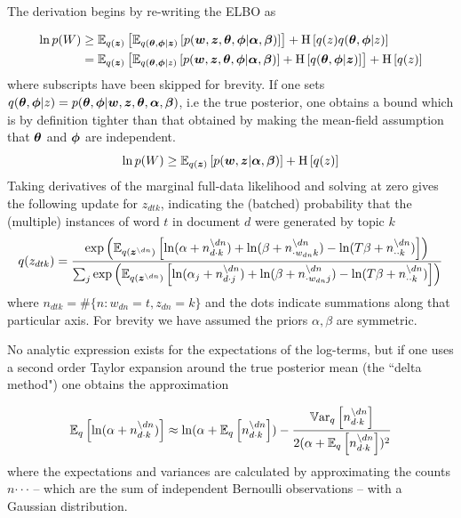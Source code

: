 The derivation begins by re-writing the ELBO as

\begin{align}
\ln p(W) & \geq \ex{\ex{p(\vv{w},\vv{z},\vv{\theta},\vv{\phi}|\vv{\alpha},\vv{\beta})}{q(\vv{\theta},\vv{\phi}|\vv{z})}}{q(\vv{z})}
+\ent{q(z)q(\vv{\theta},\vv{\phi}|z)}\\
& = \ex{\ex{p(\vv{w},\vv{z},\vv{\theta},\vv{\phi}|\vv{\alpha},\vv{\beta})}{q(\vv{\theta},\vv{\phi}|z)} + \ent{q(\vv{\theta},\vv{\phi}|\vv{z})}}{q(\vv{z})}
+\ent{q(z)} 
\end{align}
where subscripts have been skipped for brevity. If one sets $q(\vv{\theta},\vv{\phi}|z) = p(\vv{\theta},\vv{\phi}|\vv{w},\vv{z},\vv{\theta},\vv{\alpha},\vv{\beta})$, i.e the true posterior, one obtains a bound which is by definition tighter than that obtained by making the mean-field assumption that $\vv{\theta}$ and $\vv{\phi}$ are independent. 
\begin{equation}
\ln p(W) \geq \ex{p(\vv{w},\vv{z}|\vv{\alpha},\vv{\beta})}{q(\vv{z})} + \ent{q(z)}
\end{equation}
Taking derivatives of the marginal full-data likelihood and solving at zero gives the following update for $z_{dtk}$, indicating the (batched) probability that the (multiple) instances of word $t$ in document $d$ were generated by topic $k$
{\small
\begin{align}
q(z_{dtk}) =
\frac{
    \exp\left(
        \ex{
            \ln(\alpha + n_{d\cdot k}^{\setminus dn})
            +\ln(\beta + n_{\cdot w_{dn} k}^{\setminus dn})
            -\ln(T \beta + n_{\cdot \cdot k}^{\setminus dn})
        }{q(\vv{z}^{\setminus dn})}
    \right)
} {
    \sum_j \exp \left(
        \ex{
            \ln(\alpha_j + n_{d\cdot j}^{\setminus dn})
            +\ln(\beta + n_{\cdot w_{dn} j}^{\setminus dn})
            -\ln(T \beta + n_{\cdot \cdot k}^{\setminus dn})
        }{q(\vv{z}^{\setminus dn})}
    \right)
}
\end{align}
}
where $n_{dtk} = \#\{n : w_{dn} = t, z_{dn} = k\}$ and the dots indicate summations along that particular axis. For brevity we have assumed the priors $\alpha, \beta$ are symmetric.

No analytic expression exists for the expectations of the log-terms, but if one uses a second order Taylor expansion around the true posterior mean (the ``delta method"\cite{Wang2013}) one obtains the approximation

\begin{align}
\ex{\ln(\alpha + n_{d\cdot k}^{\setminus dn})}{q}
\approx
\ln(\alpha + \ex{n_{d\cdot k}^{\setminus dn}}{q})
- \frac{
    \var{n_{d\cdot k}^{\setminus dn}}{q}
  } {
      2 (\alpha + \ex{n_{d\cdot k}^{\setminus dn}}{q})^2 
  }
\end{align}
where the expectations and variances are calculated by approximating the counts $n{\cdot \cdot \cdot}$ -- which are the sum of independent Bernoulli observations -- with a Gaussian distribution.

